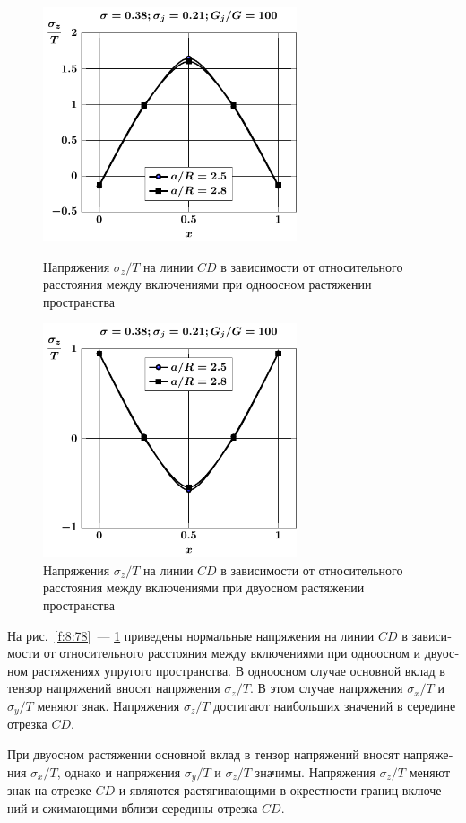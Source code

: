 \begin{russian}
\begin{figure}[h!]
\centering\footnotesize
\parbox[b]{7.5cm}{\centering\includegraphics[width=7.5cm]{inc13-a-d95-g100-t1-sig_z-cd.pdf}
\caption{Напряжения $\sigma_z/T$ на линии  $CD$ в зависимости от относительного расстояния между включениями при одноосном растяжении пространства
\label{f:8:82}}}\hfil\hfil
\parbox[b]{7.5cm}{\centering\includegraphics[width=7.5cm]{inc13-a-d95-g100-t2-sig_z-cd.pdf}
\caption{Напряжения $\sigma_z/T$ на линии  $CD$ в зависимости от относительного расстояния между включениями при двуосном растяжении пространства
\label{f:8:83}}}
\end{figure}

На рис.~\ref{f:8:78}~--- \ref{f:8:83} приведены нормальные напряжения на линии $CD$ в зависимости от относительного расстояния между включениями при одноосном и двуосном растяжениях упругого пространства. В одноосном случае основной вклад в тензор напряжений вносят напряжения $\sigma_z/T$. В этом случае напряжения $\sigma_x/T$ и $\sigma_y/T$ меняют знак. Напряжения $\sigma_z/T$ достигают наибольших значений в середине отрезка $CD$.

При двуосном растяжении основной вклад в тензор напряжений вносят напряжения $\sigma_x/T$, однако и напряжения $\sigma_y/T$ и $\sigma_z/T$ значимы. Напряжения $\sigma_z/T$ меняют знак на отрезке $CD$ и являются растягивающими в окрестности границ включений и сжимающими вблизи середины отрезка $CD$.


\end{russian}
